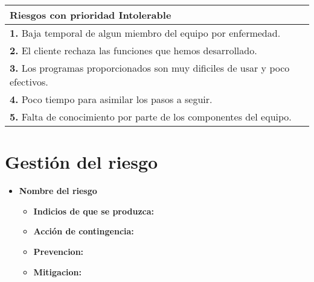 \documentclass[spanish,a4paper,12pt]{report}	%
\begin{document}
			\begin{tabular}{|p{12cm}|}
				\hline
				\textbf{Riesgos con prioridad Intolerable}\\ \hline \hline
				\textbf{1.} Baja temporal de algun miembro del equipo por enfermedad.\\ \hline 
				\textbf{2.} El cliente rechaza las funciones que hemos desarrollado.\\ \hline
				\textbf{3.} Los programas proporcionados son muy dificiles de usar y poco efectivos. \\ \hline
				\textbf{4.} Poco tiempo para asimilar los pasos a seguir. \\ \hline
				\textbf{5.} Falta de conocimiento por parte de los componentes del equipo.\\ \hline
			\end{tabular}

\part{Gestión del riesgo}
\begin{itemize}
\item \textbf{Nombre del riesgo}			%
	\begin{itemize}
		\item \textbf {Indicios de que se produzca: }
		\item \textbf {Acción de contingencia: }
		\item \textbf {Prevencion: }
		\item \textbf {Mitigacion: }
	\end{itemize}
\end{itemize}


\newpage
\mbox{}
\thispagestyle{empty}						%
\newpage
\end{document}
